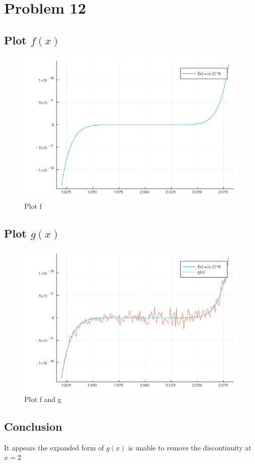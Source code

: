 \section{Problem 12}%
\label{sec:problem_12}

\subsection{Plot $f(x)$}%
\label{sub:12.1}

\begin{figure}[H]
  \centering
  \includegraphics[width=0.8\linewidth]{plot_a.png}
  \caption{Plot f}%
  \label{fig:plota}
\end{figure}

\subsection{Plot $g(x)$}%
\label{sub:12.2}

\begin{figure}[H]
  \centering
  \includegraphics[width=0.8\linewidth]{plot_b.png}
  \caption{Plot f and g}%
  \label{fig:plotb}
\end{figure}

\subsection{Conclusion}%
\label{sub:12.3}

It appears the expanded form of $g(x)$ is unable to remove the discontinuity at
$x = 2$
